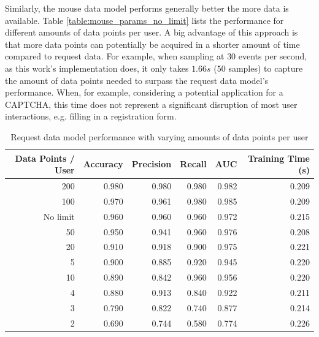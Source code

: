 \documentclass[
    fontsize=12pt,
    headings=small,
    parskip=half,           %
    bibliography=totoc,
    numbers=noenddot,       %
    open=any,               %
    final,                   %
    table
]{scrreprt}
\begin{document}
Similarly, the mouse data model performs generally better the more data is available. Table \ref{table:mouse_params_no_limit} lists the performance for different amounts of data points per user. A big advantage of this approach is that more data points can potentially be acquired in a shorter amount of time compared to request data. For example, when sampling at $30$ events per second, as this work's implementation does, it only takes $1.66s$ ($50$ samples) to capture the amount of data points needed to surpass the request data model's performance. When, for example, considering a potential application for a CAPTCHA, this time does not represent a significant disruption of most user interactions, e.g. filling in a registration form.

\begin{table}[H]
    \begin{center}
        \begin{tabular}{rrrrrr}
            \toprule
            Data Points / User & Accuracy & Precision & Recall & AUC & Training Time (s) \\
            \midrule
            200 & 0.980 & 0.980 & 0.980 & 0.982 & 0.209 \\
            100 & 0.970 & 0.961 & 0.980 & 0.985 & 0.209 \\
            No limit & 0.960 & 0.960 & 0.960 & 0.972 & 0.215 \\
            50 & 0.950 & 0.941 & 0.960 & 0.976 & 0.208 \\
            20 & 0.910 & 0.918 & 0.900 & 0.975 & 0.221 \\
            5 & 0.900 & 0.885 & 0.920 & 0.945 & 0.220 \\
            10 & 0.890 & 0.842 & 0.960 & 0.956 & 0.220 \\
            4 & 0.880 & 0.913 & 0.840 & 0.922 & 0.211 \\
            3 & 0.790 & 0.822 & 0.740 & 0.877 & 0.214 \\
            2 & 0.690 & 0.744 & 0.580 & 0.774 & 0.226 \\
            \bottomrule
        \end{tabular}
    \end{center}
    \caption{Request data model performance with varying amounts of data points per user}
    \label{table:request_params_no_limit}
\end{table}
\end{document}
